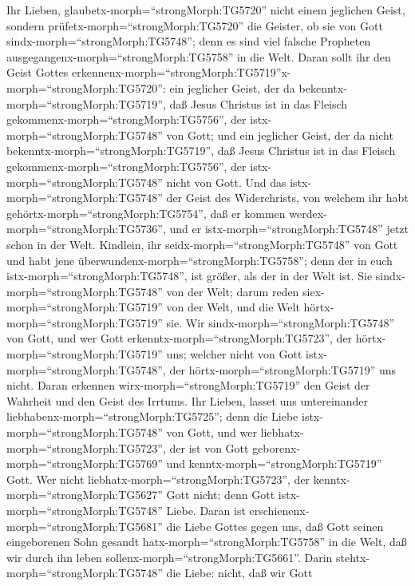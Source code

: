  Ihr Lieben, glaubetx-morph=``strongMorph:TG5720'' nicht
einem jeglichen Geist, sondern prüfetx-morph=``strongMorph:TG5720'' die
Geister, ob sie von Gott sindx-morph=``strongMorph:TG5748''; denn es
sind viel falsche Propheten ausgegangenx-morph=``strongMorph:TG5758'' in
die Welt.  Daran sollt ihr den Geist Gottes
erkennenx-morph=``strongMorph:TG5719''\textbar x-morph=``strongMorph:TG5720'':
ein jeglicher Geist, der da bekenntx-morph=``strongMorph:TG5719'', daß
Jesus Christus ist in das Fleisch
gekommenx-morph=``strongMorph:TG5756'', der
istx-morph=``strongMorph:TG5748'' von Gott;  und ein
jeglicher Geist, der da nicht bekenntx-morph=``strongMorph:TG5719'', daß
Jesus Christus ist in das Fleisch
gekommenx-morph=``strongMorph:TG5756'', der
istx-morph=``strongMorph:TG5748'' nicht von Gott. Und das
istx-morph=``strongMorph:TG5748'' der Geist des Widerchrists, von
welchem ihr habt gehörtx-morph=``strongMorph:TG5754'', daß er kommen
werdex-morph=``strongMorph:TG5736'', und er
istx-morph=``strongMorph:TG5748'' jetzt schon in der Welt. 
Kindlein, ihr seidx-morph=``strongMorph:TG5748'' von Gott und habt jene
überwundenx-morph=``strongMorph:TG5758''; denn der in euch
istx-morph=``strongMorph:TG5748'', ist größer, als der in der Welt ist.
 Sie sindx-morph=``strongMorph:TG5748'' von der Welt; darum
reden siex-morph=``strongMorph:TG5719'' von der Welt, und die Welt
hörtx-morph=``strongMorph:TG5719'' sie.  Wir
sindx-morph=``strongMorph:TG5748'' von Gott, und wer Gott
erkenntx-morph=``strongMorph:TG5723'', der
hörtx-morph=``strongMorph:TG5719'' uns; welcher nicht von Gott
istx-morph=``strongMorph:TG5748'', der
hörtx-morph=``strongMorph:TG5719'' uns nicht. Daran erkennen
wirx-morph=``strongMorph:TG5719'' den Geist der Wahrheit und den Geist
des Irrtums.  Ihr Lieben, lasset uns untereinander
liebhabenx-morph=``strongMorph:TG5725''; denn die Liebe
istx-morph=``strongMorph:TG5748'' von Gott, und wer
liebhatx-morph=``strongMorph:TG5723'', der ist von Gott
geborenx-morph=``strongMorph:TG5769'' und
kenntx-morph=``strongMorph:TG5719'' Gott.  Wer nicht
liebhatx-morph=``strongMorph:TG5723'', der
kenntx-morph=``strongMorph:TG5627'' Gott nicht; denn Gott
istx-morph=``strongMorph:TG5748'' Liebe.  Daran ist
erschienenx-morph=``strongMorph:TG5681'' die Liebe Gottes gegen uns, daß
Gott seinen eingeborenen Sohn gesandt hatx-morph=``strongMorph:TG5758''
in die Welt, daß wir durch ihn leben
sollenx-morph=``strongMorph:TG5661''.  Darin
stehtx-morph=``strongMorph:TG5748'' die Liebe: nicht, daß wir Gott
